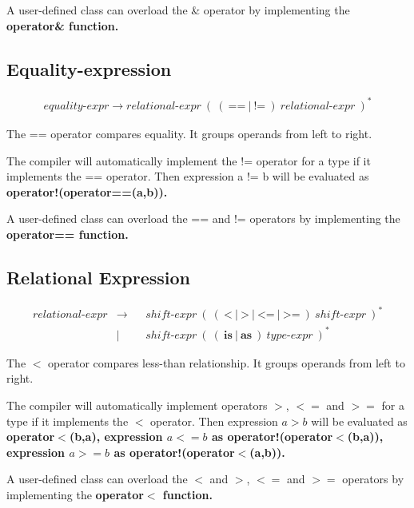 \documentclass[a4paper,oneside,11pt]{article}
\begin{document}
A user-defined class can overload the \& operator by implementing the \bf{operator\&} function.

\subsection{Equality-expression}\label{equality}

\begin{align*}
equality\textrm{-}expr \rightarrow \hyperref[relational]{relational\textrm{-}expr} \> ( \> ( \> \texttt{==} \> | \> \texttt{!=} \> ) \>
\hyperref[relational]{relational\textrm{-}expr} \>)^*
\end{align*}

The == operator compares equality. It groups operands from left to right.

The compiler will automatically implement the != operator for a type if it implements the == operator.
Then expression a != b will be evaluated as \bf{operator!(operator==(a,b))}.

A user-defined class can overload the == and != operators by implementing the \bf{operator==} function.

\subsection{Relational Expression}\label{relational}

\begin{align*}
relational\textrm{-}expr &\rightarrow & &\hyperref[shift]{shift\textrm{-}expr} \> ( \> ( \> \texttt{<} \> | \> \texttt{>} \> | \> \texttt{<=} \> |
\> \texttt{>=} \> ) \> \hyperref[shift]{shift\textrm{-}expr} \> )^*\\
&| & &\hyperref[shift]{shift\textrm{-}expr} \> ( \> ( \> \textbf{is} \> | \> \textbf{as} \> ) \> \hyperref[typeexpr]{type\textrm{-}expr} \>)^*
\end{align*}

The $<$ operator compares less-than relationship. It groups operands from left to right.

The compiler will automatically implement operators $>$, $<=$ and $>=$ for a type if it implements the $<$ operator.
Then expression $a > b$ will be evaluated as \bf{operator$<$(b,a)},
expression $a <= b$ as \bf{operator!(operator$<$(b,a))},
expression $a >= b$ as \bf{operator!(operator$<$(a,b))}.

A user-defined class can overload the $<$ and $>$, $<=$ and $>=$ operators by implementing the \bf{operator$<$} function.
\end{document}
